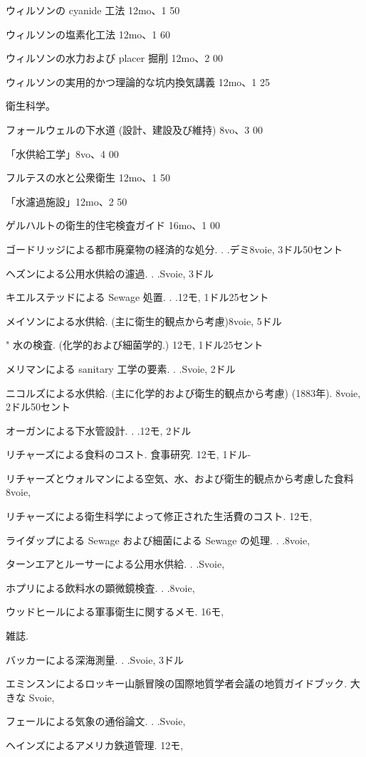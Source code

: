 \documentclass[a4paper,11pt,openany]{ltjsbook}
\begin{document}
ウィルソンの cyanide 工法 12mo、1 50

ウィルソンの塩素化工法 12mo、1 60

ウィルソンの水力および placer 掘削 12mo、2 00

ウィルソンの実用的かつ理論的な坑内換気講義 12mo、1 25

衛生科学。

フォールウェルの下水道 (設計、建設及び維持) 8vo、3 00

「水供給工学」8vo、4 00

フルテスの水と公衆衛生 12mo、1 50

「水濾過施設」12mo、2 50

ゲルハルトの衛生的住宅検査ガイド 16mo、1 00

ゴードリッジによる都市廃棄物の経済的な処分. . .デミ8voie, 3ドル50セント

ヘズンによる公用水供給の濾過. . .Svoie, 3ドル

キエルステッドによる Sewage 処置. . .12モ, 1ドル25セント

メイソンによる水供給. (主に衛生的観点から考慮)8voie, 5ドル

"        水の検査. (化学的および細菌学的.) 12モ, 1ドル25セント

メリマンによる sanitary 工学の要素. . .Svoie, 2ドル

ニコルズによる水供給. (主に化学的および衛生的観点から考慮) (1883年). 8voie, 2ドル50セント

オーガンによる下水管設計. . .12モ, 2ドル

リチャーズによる食料のコスト. 食事研究. 12モ, 1ドル-

リチャーズとウォルマンによる空気、水、および衛生的観点から考慮した食料8voie,

リチャーズによる衛生科学によって修正された生活費のコスト. 12モ,

ライダップによる Sewage および細菌による Sewage の処理. . .8voie,

ターンエアとルーサーによる公用水供給. . .Svoie,

ホプリによる飲料水の顕微鏡検査. . .8voie,

ウッドヒールによる軍事衛生に関するメモ. 16モ,

雑誌.

バッカーによる深海測量. . .Svoie, 3ドル

エミンスンによるロッキー山脈冒険の国際地質学者会議の地質ガイドブック. 大きな Svoie,

フェールによる気象の通俗論文. . .Svoie,

ヘインズによるアメリカ鉄道管理. 12モ,
\end{document}
